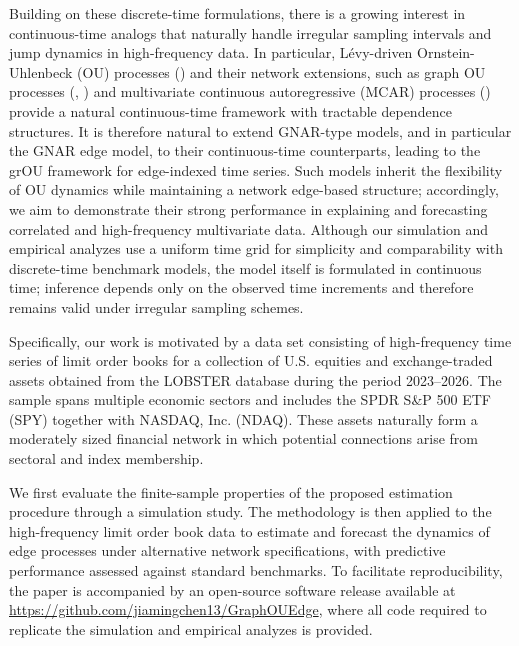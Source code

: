 \documentclass[12pt]{amsart}
\numberwithin{equation}{section}
\newcommand{\1}{\mathbf{1}}
\begin{document}
Building on these discrete-time formulations, there is a growing interest in continuous-time analogs that naturally handle irregular sampling intervals and jump dynamics in high-frequency data. In particular, L\'evy-driven Ornstein-Uhlenbeck (OU) processes (\cite{barndorff2001non}) and their network extensions, such as graph OU processes (\cite{courgeau2022high}, \cite{courgeau2022likelihood}) and  multivariate continuous autoregressive (MCAR) processes (\cite{lucchese2026estimation}) provide a natural continuous-time framework with tractable dependence structures. It is therefore natural to extend GNAR-type models, and in particular the GNAR edge model, to their continuous-time counterparts, leading to the grOU framework for edge-indexed time series. Such models inherit the flexibility of OU dynamics while maintaining a network edge-based structure; accordingly, we aim to demonstrate their strong performance in explaining and forecasting correlated and high-frequency multivariate data. Although our simulation and empirical analyzes use a uniform time grid for simplicity and comparability with discrete-time benchmark models, the model itself is formulated in continuous time; inference depends only on the observed time increments and therefore remains valid under irregular sampling schemes.

Specifically, our work is motivated by a data set consisting of high-frequency time series of limit order books for a collection of U.S. equities and exchange-traded assets obtained from the LOBSTER database during the period 2023–2026. The sample spans multiple economic sectors and includes the SPDR S\&P 500 ETF (SPY) together with NASDAQ, Inc. (NDAQ). These assets naturally form a moderately sized financial network in which potential connections arise from sectoral and index membership.

We first evaluate the finite-sample properties of the proposed estimation procedure through a simulation study. The methodology is then applied to the high-frequency limit order book data to estimate and forecast the dynamics of edge processes under alternative network specifications, with predictive performance assessed against standard benchmarks. To facilitate reproducibility, the paper is accompanied by an open-source software release available at \href{https://github.com/jiamingchen13/GraphOUEdge}{https://github.com/jiamingchen13/GraphOUEdge}, where all code required to replicate the simulation and empirical analyzes is provided.
\end{document}
